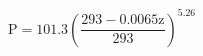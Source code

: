 \documentclass[12pt]{article}
\begin{document}
\begin{displaymath}
\mathrm{P}=101.3\left(\frac{293-0.0065 \mathrm{z}}{293}\right)^{5.26}
\end{displaymath}
\end{document}
